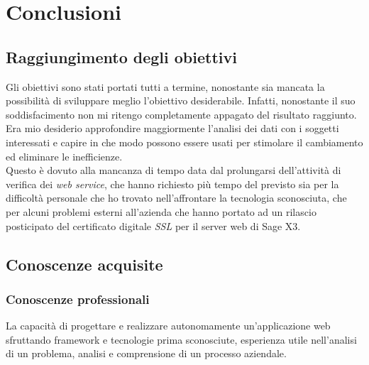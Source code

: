 

\chapter{Conclusioni}
\label{cap:conclusioni}



\section{Raggiungimento degli obiettivi}

Gli obiettivi sono stati portati tutti a termine, nonostante sia mancata la possibilità di sviluppare meglio l'obiettivo desiderabile.
Infatti, nonostante il suo soddisfacimento non mi ritengo completamente appagato del risultato raggiunto. \\
Era mio desiderio approfondire maggiormente l'analisi dei dati con i soggetti interessati e capire in che modo possono essere usati per stimolare il cambiamento ed eliminare le inefficienze.\\
Questo è dovuto alla mancanza di tempo data dal prolungarsi dell'attività di verifica dei \textit{web service}, che hanno richiesto più tempo del previsto sia per la difficoltà personale che ho trovato nell'affrontare la tecnologia sconosciuta, che per alcuni problemi esterni all'azienda che hanno portato ad un rilascio posticipato del certificato digitale \textit{SSL} per il server web di Sage X3.




\section{Conoscenze acquisite}

\subsection{Conoscenze professionali}

La capacità di progettare e realizzare autonomamente un'applicazione web sfruttando
framework e tecnologie prima sconosciute, esperienza utile nell'analisi di un problema,
analisi e comprensione di un processo aziendale.

